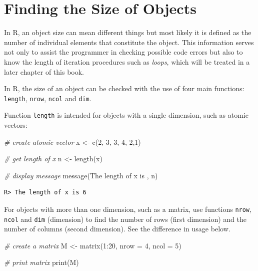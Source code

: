 \documentclass[
  12pt,
]{book}
\newenvironment{Shaded}{\begin{snugshade}}{\end{snugshade}}
\newcommand{\AttributeTok}[1]{\textcolor[rgb]{0.61,0.61,0.61}{#1}}
\newcommand{\CommentTok}[1]{\textcolor[rgb]{0.37,0.37,0.37}{\textit{#1}}}
\newcommand{\DecValTok}[1]{\textcolor[rgb]{0.06,0.06,0.06}{#1}}
\newcommand{\FunctionTok}[1]{\textcolor[rgb]{0,0,0}{#1}}
\newcommand{\NormalTok}[1]{#1}
\newcommand{\OtherTok}[1]{\textcolor[rgb]{0.37,0.37,0.37}{#1}}
\newcommand{\SpecialCharTok}[1]{\textcolor[rgb]{0,0,0}{#1}}
\newcommand{\StringTok}[1]{\textcolor[rgb]{0.5,0.5,0.5}{#1}}
\begin{document}
\hypertarget{finding-the-size-of-objects}{%
\section{Finding the Size of Objects}\label{finding-the-size-of-objects}}

In R, an object size can mean different things but most likely it is defined as the number of individual elements that constitute the object. This information serves not only to assist the programmer in checking possible code errors but also to know the length of iteration procedures such as \emph{loops}, which will be treated in a later chapter of this book.

In R, the size of an object can be checked with the use of four main functions: \texttt{length}, \texttt{nrow}, \texttt{ncol} and \texttt{dim}.    

Function \texttt{length} is intended for objects with a single dimension, such as atomic vectors:

\begin{Shaded}
\begin{Highlighting}[]
\CommentTok{\# create atomic vector}
\NormalTok{x }\OtherTok{\textless{}{-}} \FunctionTok{c}\NormalTok{(}\DecValTok{2}\NormalTok{, }\DecValTok{3}\NormalTok{, }\DecValTok{3}\NormalTok{, }\DecValTok{4}\NormalTok{, }\DecValTok{2}\NormalTok{,}\DecValTok{1}\NormalTok{)}

\CommentTok{\# get length of x}
\NormalTok{n }\OtherTok{\textless{}{-}} \FunctionTok{length}\NormalTok{(x)}

\CommentTok{\# display message}
\FunctionTok{message}\NormalTok{(}\StringTok{\textquotesingle{}The length of x is \textquotesingle{}}\NormalTok{, n)}
\end{Highlighting}
\end{Shaded}

\begin{verbatim}
R> The length of x is 6
\end{verbatim}

For objects with more than one dimension, such as a matrix, use functions \texttt{nrow}, \texttt{ncol} and \texttt{dim} (dimension) to find the number of rows (first dimension) and the number of columns (second dimension). See the difference in usage below.

\begin{Shaded}
\begin{Highlighting}[]
\CommentTok{\# create a matrix}
\NormalTok{M }\OtherTok{\textless{}{-}} \FunctionTok{matrix}\NormalTok{(}\DecValTok{1}\SpecialCharTok{:}\DecValTok{20}\NormalTok{, }\AttributeTok{nrow =} \DecValTok{4}\NormalTok{, }\AttributeTok{ncol =} \DecValTok{5}\NormalTok{)}

\CommentTok{\# print matrix}
\FunctionTok{print}\NormalTok{(M)}
\end{Highlighting}
\end{Shaded}
\end{document}
